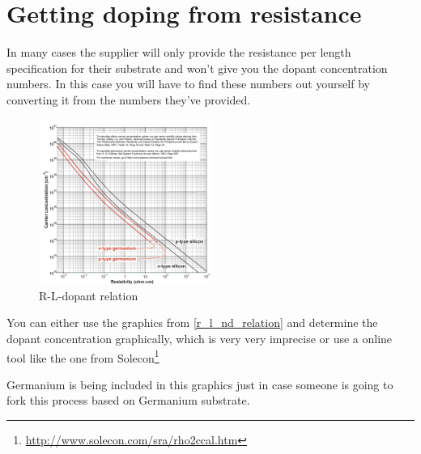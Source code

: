 \section{Getting doping from resistance}
In many cases the supplier will only provide the resistance per length specification for their substrate and won't give you the dopant concentration numbers.
In this case you will have to find these numbers out yourself by converting it from the numbers they've provided.

\begin{figure}[H]
	\centering
	\includegraphics[width=0.5\textwidth]{resistance_doping.png}
	\caption{R-L-dopant relation}
	\label{r_l_nd_relation}
\end{figure}

You can either use the graphics from \autoref{r_l_nd_relation} and determine the dopant concentration graphically, which is very very imprecise or use a online tool like the one from Solecon\footnote{\url{http://www.solecon.com/sra/rho2ccal.htm}}

Germanium is being included in this graphics just in case someone is going to fork this process based on Germanium substrate.